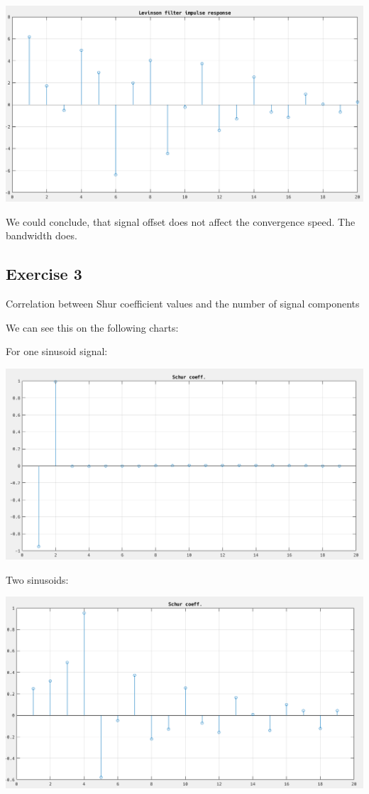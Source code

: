 \documentclass[12pt]{article}
\begin{document}
\includegraphics[width=\textwidth]{10.png}

We could conclude, that signal offset does not affect the convergence speed. The bandwidth does.

\subsection{Exercise 3}

Correlation between Shur coefficient values and the number of signal components

We can see this on the following charts:

For one sinusoid signal:

\includegraphics[width=\textwidth]{11.png}

Two sinusoids:

\includegraphics[width=\textwidth]{12.png}
\end{document}
